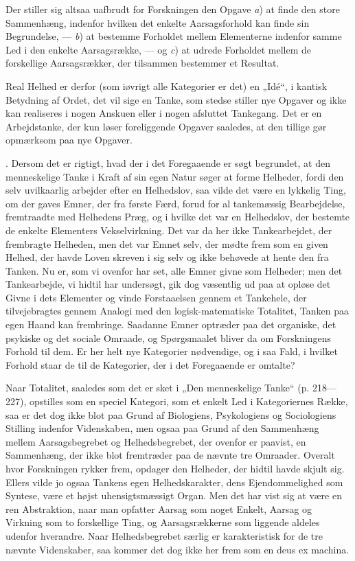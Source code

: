 \documentclass[12pt]{article}
\newcommand{\opage}[1]{\marginnote{\footnotesize\textit{[#1]}}}
\begin{document}
Der stiller sig altsaa uafbrudt for Forskningen den Opgave \textit{a}) at finde
den store Sammenhæng, indenfor hvilken det enkelte Aarsagsforhold kan finde sin
Begrundelse, --- \textit{b}) at bestemme Forholdet mellem Elementerne indenfor
samme Led i den enkelte Aarsagsrække, --- og \textit{c}) at udrede Forholdet
mellem de forskellige Aarsagsrækker, der tilsammen bestemmer et Resultat.

Real Helhed er derfor (som iøvrigt alle Kategorier er det) en „Idé“, i kantisk
Betydning af Ordet, det vil sige en Tanke, som stedse stiller nye Opgaver og
ikke kan realiseres i nogen Anskuen eller i nogen afsluttet Tankegang. Det er en
Arbejdstanke, der kun løser foreliggende Opgaver saaledes, at den tillige gør
opmærksom paa nye Opgaver.

. Dersom det er rigtigt, hvad der i det Foregaaende er søgt begrundet, at den
menneskelige Tanke i Kraft af sin egen Natur søger at forme Helheder, fordi den
selv uvilkaarlig arbejder efter en Helhedslov, saa vilde det være en lykkelig
Ting, om der gaves Emner, der fra første Færd, forud for al tankemæssig
Bearbejdelse, fremtraadte med Helhedens Præg, og i hvilke det var en Helhedslov,
der bestemte de enkelte Elementers Vekselvirkning. Det var da her ikke
Tankearbejdet, der frembragte Helheden, men det var Emnet selv, der mødte frem
som en given Helhed, der havde Loven skreven i sig selv og ikke behøvede at
hente den fra Tanken. Nu er, som vi ovenfor har set, alle Emner givne som
Helheder; men det Tankearbejde, vi hidtil har undersøgt, gik dog væsentlig ud
paa at opløse det Givne i dets Elementer og vinde Forstaaelsen gennem et
Tankehele, der tilvejebragtes gennem Analogi med den logisk-matematiske
Totalitet, Tanken paa egen Haand kan frembringe. Saadanne Emner optræder paa det
organiske, det psykiske og det sociale Omraade, og Spørgsmaalet bliver da om
Forskningens Forhold til dem. Er her helt nye Kategorier nødvendige, og i saa
Fald, i hvilket Forhold staar de til de Kategorier, der i det Foregaaende er
omtalte?

\opage{51}Naar Totalitet, saaledes som det er sket i „Den menneskelige Tanke“ (p. 218---227),
opstilles som en speciel Kategori, som et enkelt Led i Kategoriernes Række,
saa er det dog ikke blot paa Grund af Biologiens, Psykologiens og Sociologiens
Stilling indenfor Videnskaben, men ogsaa paa Grund af den Sammenhæng mellem
Aarsagsbegrebet og Helhedsbegrebet, der ovenfor er paavist, en Sammenhæng, der
ikke blot fremtræder paa de nævnte tre Omraader. Overalt hvor Forskningen rykker
frem, opdager den Helheder, der hidtil havde skjult sig. Ellers vilde jo ogsaa
Tankens egen Helhedskarakter, dens Ejendommelighed som Syntese, være et højst
uhensigtsmæssigt Organ. Men det har vist sig at være en ren Abstraktion, naar
man opfatter Aarsag som noget Enkelt, Aarsag og Virkning som to forskellige Ting,
og Aarsagsrækkerne som liggende aldeles udenfor hverandre. Naar Helhedsbegrebet
særlig er karakteristisk for de tre nævnte Videnskaber, saa kommer det dog ikke
her frem som en deus ex machina.
\end{document}

